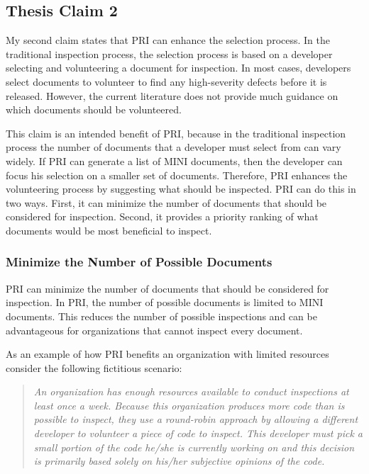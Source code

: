 \subsection{Thesis Claim 2}
My second claim states that PRI can enhance the selection process. In the
traditional inspection process, the selection process is based on a
developer selecting and volunteering a document for inspection. In most
cases, developers select documents to volunteer to find any high-severity
defects before it is released. However, the current literature does not
provide much guidance on which documents should be volunteered.

This claim is an intended benefit of PRI, because in the traditional
inspection process the number of documents that a developer must select
from can vary widely. If PRI can generate a list of MINI documents, then
the developer can focus his selection on a smaller set of documents.
Therefore, PRI enhances the volunteering process by suggesting what should
be inspected. PRI can do this in two ways. First, it can minimize the
number of documents that should be considered for inspection. Second, it
provides a priority ranking of what documents would be most beneficial to
inspect.

\subsubsection{Minimize the Number of Possible Documents}
PRI can minimize the number of documents that should be considered for
inspection. In PRI, the number of possible documents is limited to MINI
documents. This reduces the number of possible inspections and can be
advantageous for organizations that cannot inspect every document. 


As an example of how PRI benefits an organization with limited resources
consider the following fictitious scenario:

\begin{quotation}
  \textit{ An organization has enough resources available to conduct
    inspections at least once a week. Because this organization produces
    more code than is possible to inspect, they use a round-robin approach
    by allowing a different developer to volunteer a piece of code to
    inspect. This developer must pick a small portion of the code he/she is
    currently working on and this decision is primarily based solely on
    his/her subjective opinions of the code.  }
\end{quotation}

